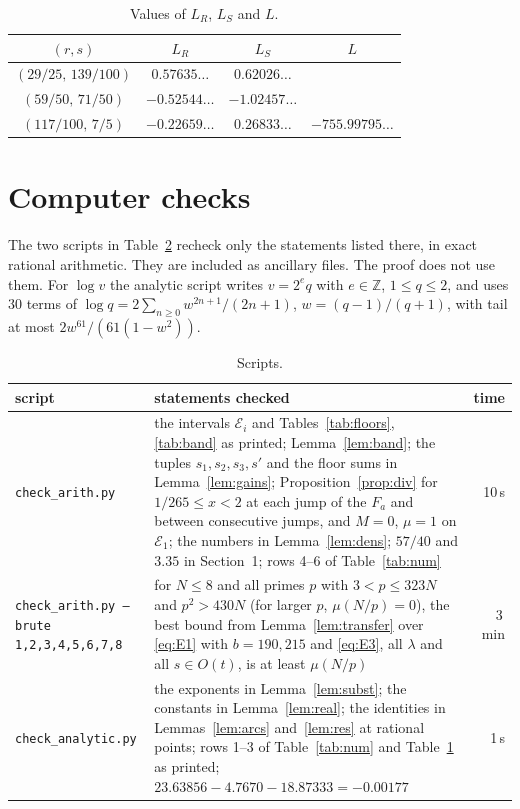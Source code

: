 \documentclass{amsart}
\numberwithin{equation}{section}
\numberwithin{table}{section}
\newcommand{\Z}{\mathbb{Z}}
\begin{document}
\begin{table}[ht]
\caption{Values of $L_R$, $L_S$ and $L$.}\label{tab:grad}
\centering\small
\begin{tabular}{c|ccc}
$(r,s)$ & $L_R$ & $L_S$ & $L$\\ \hline
$(29/25,\,139/100)$ & $0.57635\ldots$ & $0.62026\ldots$ & \\
$(59/50,\,71/50)$ & $-0.52544\ldots$ & $-1.02457\ldots$ & \\
$(117/100,\,7/5)$ & $-0.22659\ldots$ & $0.26833\ldots$ & $-755.99795\ldots$
\end{tabular}
\end{table}

\section{Computer checks}\label{app:ver}

The two scripts in Table~\ref{tab:checks} recheck only the statements listed
there, in exact rational arithmetic. They are included as ancillary files.
The proof does not use them. For
$\log v$ the analytic script writes $v=2^eq$ with $e\in\Z$, $1\le q\le2$, and
uses $30$ terms of $\log q=2\sum_{n\ge0}w^{2n+1}/(2n+1)$, $w=(q-1)/(q+1)$,
with tail at most $2w^{61}/(61(1-w^2))$.

\begin{table}[ht]
\caption{Scripts.}\label{tab:checks}
\centering\small
\begin{tabular}{>{\raggedright}p{}>{\raggedright}p{}r}
script & statements checked & time\tabularnewline \hline
\texttt{check\_arith.py} & the intervals $\mathcal E_i$ and Tables~\ref{tab:floors}, \ref{tab:band} as printed; Lemma~\ref{lem:band}; the tuples $s_1,s_2,s_3,s'$ and the floor sums in Lemma~\ref{lem:gains}; Proposition~\ref{prop:div} for $1/265\le x<2$ at each jump of the $F_a$ and between consecutive jumps, and $M=0$, $\mu=1$ on $\mathcal E_1$; the numbers in Lemma~\ref{lem:dens}; $57/40$ and $3.35$ in Section~1; rows 4--6 of Table~\ref{tab:num} & 10\,s\tabularnewline
\texttt{check\_arith.py --brute 1,2,3,4,5,6,7,8} & for $N\le8$ and all primes $p$ with $3<p\le323N$ and $p^2>430N$ (for larger $p$, $\mu(N/p)=0$), the best bound from Lemma~\ref{lem:transfer} over \eqref{eq:E1} with $b=190,215$ and \eqref{eq:E3}, all $\lambda$ and all $s\in O(t)$, is at least $\mu(N/p)$ & 3\,min\tabularnewline
\texttt{check\_analytic.py} & the exponents in Lemma~\ref{lem:subst}; the constants in Lemma~\ref{lem:real}; the identities in Lemmas~\ref{lem:arcs} and~\ref{lem:res} at rational points; rows 1--3 of Table~\ref{tab:num} and Table~\ref{tab:grad} as printed; $23.63856-4.7670-18.87333=-0.00177$ & 1\,s\tabularnewline
\end{tabular}
\end{table}
\end{document}
